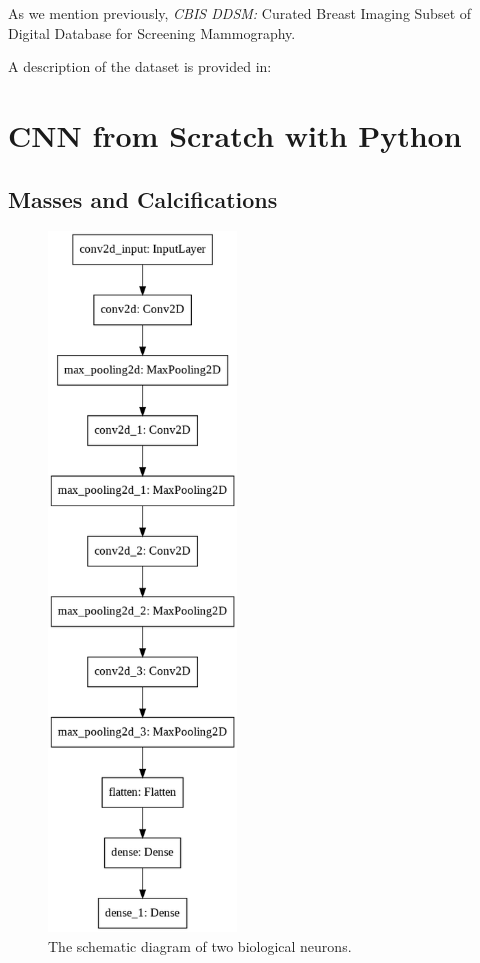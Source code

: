 \documentclass{book}
\begin{document}
    
    As we mention previously,  \textit{CBIS DDSM:} Curated Breast Imaging Subset of Digital Database for Screening Mammography.

    A description of the dataset is provided in:


    \chapter{CNN from Scratch with Python}
    
        \section{Masses and Calcifications} %

        \begin{figure}[h]
            \centering
            \includegraphics[width=5cm]{smc-best-model.png}
            \caption{The schematic diagram of two biological neurons.}\label{fig:neurons}
        \end{figure}
\end{document}

